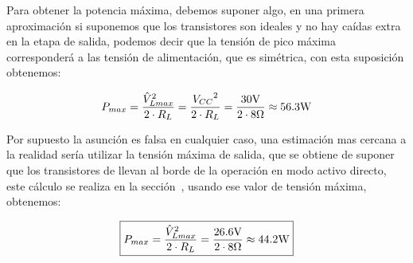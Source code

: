 \vspace{1.5cm}
\label{max_pot}

Para obtener la potencia máxima, debemos suponer algo, en una primera aproximación si suponemos que los transistores son ideales y no hay caídas extra en la etapa de salida, podemos decir que la tensión de pico máxima corresponderá a las tensión de alimentación, que es simétrica, con esta suposición obtenemos:


\begin{equation} \label{eq:1}
P_{max} = \frac{{\hat{V}_{L{max}}}^2}{2 \cdot R_{L}} = \frac{{V_{CC}}^2}{2 \cdot R_{L}} = \frac{30 \si[per-mode=symbol]{\volt}}{2 \cdot 8 \si[per-mode=symbol]{\ohm}} \approx 56.3 \si[per-mode=symbol]{\watt}
\end{equation}

Por supuesto la asunción es falsa en cualquier caso, una estimación mas cercana a la realidad sería utilizar la tensión máxima de salida, que se obtiene de suponer que los transistores de llevan al borde de la operación en modo activo directo, este cálculo se realiza en la sección~, usando ese valor de tensión máxima, obtenemos:

\begin{equation} \label{eq:1}
\boxed{ P_{max} = \frac{{\hat{V}_{L{max}}}^2}{2 \cdot R_{L}} = \frac{26.6 \si[per-mode=symbol]{\volt}}{2 \cdot 8 \si[per-mode=symbol]{\ohm}} \approx 44.2 \si[per-mode=symbol]{\watt} }
\end{equation}



\vfill

\clearpage

